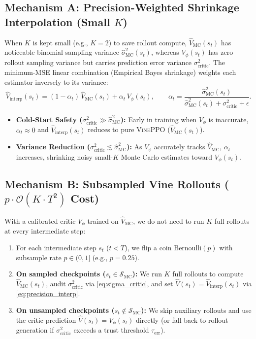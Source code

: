 \documentclass[11pt,a4paper]{article}
\newcommand{\Vmc}{\hat{V}_{\text{MC}}}
\newcommand{\Vinterp}{\hat{V}_{\text{interp}}}
\begin{document}
\subsection{Mechanism A: Precision-Weighted Shrinkage Interpolation (Small \texorpdfstring{$K$}{K})}
When $K$ is kept small (e.g., $K = 2$) to save rollout compute, $\Vmc(s_t)$ has noticeable binomial sampling variance $\hat{\sigma}^2_{\text{MC}}(s_t)$, whereas $V_\phi(s_t)$ has zero rollout sampling variance but carries prediction error variance $\sigma^2_{\text{critic}}$. The minimum-MSE linear combination (Empirical Bayes shrinkage) weights each estimator inversely to its variance:
\begin{equation}
    \Vinterp(s_t) = (1 - \alpha_t)\,\Vmc(s_t) + \alpha_t\,V_\phi(s_t), \qquad
    \alpha_t = \frac{\hat{\sigma}^2_{\text{MC}}(s_t)}{\hat{\sigma}^2_{\text{MC}}(s_t) + \sigma^2_{\text{critic}} + \epsilon}.
    \label{eq:precision_interp}
\end{equation}
\begin{itemize}
    \item \textbf{Cold-Start Safety ($\sigma^2_{\text{critic}} \gg \hat{\sigma}^2_{\text{MC}}$):} Early in training when $V_\phi$ is inaccurate, $\alpha_t \approx 0$ and $\Vinterp(s_t)$ reduces to pure \textsc{VinePPO} ($\Vmc(s_t)$).
    \item \textbf{Variance Reduction ($\sigma^2_{\text{critic}} \lesssim \hat{\sigma}^2_{\text{MC}}$):} As $V_\phi$ accurately tracks $\Vmc$, $\alpha_t$ increases, shrinking noisy small-$K$ Monte Carlo estimates toward $V_\phi(s_t)$.
\end{itemize}

\subsection{\texorpdfstring{Mechanism B: Subsampled Vine Rollouts ($p \cdot \mathcal{O}(K \cdot T^2)$ Cost)}{Mechanism B: Subsampled Vine Rollouts (p * O(K * T2) Cost)}}
With a calibrated critic $V_\phi$ trained on $\Vmc$, we do not need to run $K$ full rollouts at every intermediate step:
\begin{enumerate}
    \item For each intermediate step $s_t$ ($t < T$), we flip a coin $\text{Bernoulli}(p)$ with subsample rate $p \in (0, 1]$ (e.g., $p = 0.25$).
    \item \textbf{On sampled checkpoints ($s_t \in \mathcal{S}_{\text{MC}}$):} We run $K$ full rollouts to compute $\Vmc(s_t)$, audit $\sigma^2_{\text{critic}}$ via \cref{eq:sigma_critic}, and set $\hat{V}(s_t) = \Vinterp(s_t)$ via \cref{eq:precision_interp}.
    \item \textbf{On unsampled checkpoints ($s_t \notin \mathcal{S}_{\text{MC}}$):} We skip auxiliary rollouts and use the critic prediction $\hat{V}(s_t) = V_\phi(s_t)$ directly (or fall back to rollout generation if $\sigma^2_{\text{critic}}$ exceeds a trust threshold $\tau_{\text{err}}$).
\end{enumerate}
\end{document}
